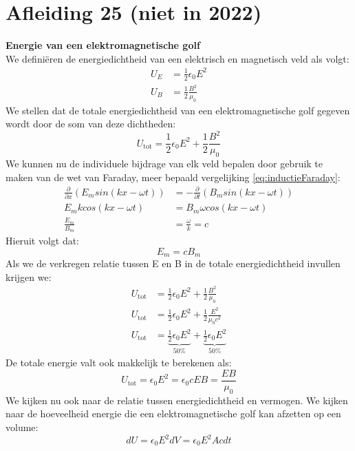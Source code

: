 \documentclass[a4paper,kul]{kulakarticle} %
\begin{document}
\section{Afleiding 25 (niet in 2022)}
\textbf{Energie van een elektromagnetische golf}\\
We definiëren de energiedichtheid van een elektrisch en magnetisch veld als volgt: 
\begin{align*}
	U_E&=\frac{1}{2}\epsilon_0E^2\\
	U_B&=\frac{1}{2}\frac{B^2}{\mu_0}
\end{align*}
We stellen dat de totale energiedichtheid van een elektromagnetische golf gegeven wordt door de som van deze dichtheden:
\begin{equation*}
	U_{\text{tot}} = \frac{1}{2}\epsilon_0E^2+\frac{1}{2}\frac{B^2}{\mu_0}
\end{equation*}
We kunnen nu de individuele bijdrage van elk veld bepalen door gebruik te maken van de wet van Faraday, meer bepaald vergelijking \ref{eq:inductieFaraday}:
\begin{align*}
	\frac{\partial}{\partial x}(E_msin(kx-\omega t)) &=-\frac{\partial}{\partial t}(B_msin(kx-\omega t))\\
	E_mkcos(kx-\omega t) &= B_m\omega cos(kx-\omega t)\\
	\frac{E_m}{B_m} &= \frac{\omega}{k} = c
\end{align*}
Hieruit volgt dat:
\begin{equation*}
	E_m=cB_m
\end{equation*}
Als we de verkregen relatie tussen E en B in de totale energiedichtheid invullen krijgen we:
\begin{align*}
	U_{\text{tot}} &= \frac{1}{2}\epsilon_0E^2+\frac{1}{2}\frac{B^2}{\mu_0}\\
	U_{\text{tot}} &= \frac{1}{2}\epsilon_0E^2+\frac{1}{2}\frac{E^2}{\mu_0c^2}\\
	U_{\text{tot}} &= \underbrace{\frac{1}{2}\epsilon_0E^2}_{\text{50\%}}+\underbrace{\frac{1}{2}\epsilon_0E^2}_{\text{50\%}}
\end{align*}
De totale energie valt ook makkelijk te berekenen als:
\begin{equation*}
	U_{\text{tot}}=\epsilon_0E^2=\epsilon_0cEB = \frac{EB}{\mu_0}
\end{equation*}
We kijken nu ook naar de relatie tussen energiedichtheid en vermogen. We kijken naar de hoeveelheid energie die een elektromagnetische golf kan afzetten op een volume:
\begin{equation*}
	dU = \epsilon_0E^2dV=\epsilon_0E^2Acdt
\end{equation*}
\end{document}
